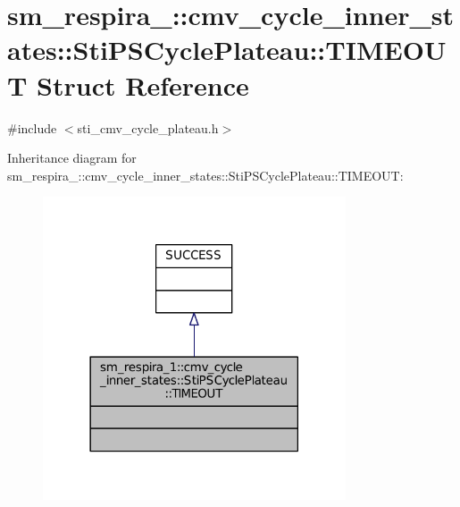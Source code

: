\hypertarget{structsm__respira__1_1_1cmv__cycle__inner__states_1_1StiPSCyclePlateau_1_1TIMEOUT}{}\section{sm\+\_\+respira\+\_\+:\+:cmv\+\_\+cycle\+\_\+inner\+\_\+states\+:\+:Sti\+P\+S\+Cycle\+Plateau\+:\+:T\+I\+M\+E\+O\+UT Struct Reference}
\label{structsm__respira__1_1_1cmv__cycle__inner__states_1_1StiPSCyclePlateau_1_1TIMEOUT}


{\ttfamily \#include $<$sti\+\_\+cmv\+\_\+cycle\+\_\+plateau.\+h$>$}



Inheritance diagram for sm\+\_\+respira\+\_\+:\+:cmv\+\_\+cycle\+\_\+inner\+\_\+states\+:\+:Sti\+P\+S\+Cycle\+Plateau\+:\+:T\+I\+M\+E\+O\+UT\+:
\nopagebreak
\begin{figure}[H]
\begin{center}
\leavevmode
\includegraphics[width=254pt]{structsm__respira__1_1_1cmv__cycle__inner__states_1_1StiPSCyclePlateau_1_1TIMEOUT__inherit__graph}
\end{center}
\end{figure}


